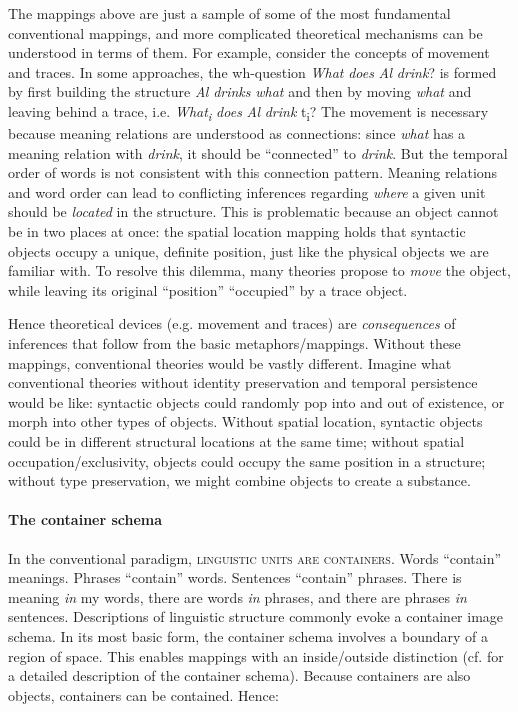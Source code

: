   The mappings above are just a sample of some of the most fundamental conventional mappings, and more complicated theoretical mechanisms can be understood in terms of them. For example, consider the concepts of movement and traces. In some approaches, the wh-question \textit{What} \textit{does} \textit{Al} \textit{drink}? is formed by first building the structure \textit{Al} \textit{drinks} \textit{what} and then by moving \textit{what} and leaving behind a trace, i.e. \textit{What\textsubscript{i}} \textit{does} \textit{Al} \textit{drink} t\textsubscript{i}? The movement is necessary because meaning relations are understood as connections: since \textit{what} has a meaning relation with \textit{drink}, it should be “connected” to \textit{drink}. But the temporal order of words is not consistent with this connection pattern. Meaning relations and word order can lead to conflicting inferences regarding \textit{where} a given unit should be \textit{located} in the structure. This is problematic because an object cannot be in two places at once: the spatial location mapping holds that syntactic objects occupy a unique, definite position, just like the physical objects we are familiar with. To resolve this dilemma, many theories propose to \textit{move} the object, while leaving its original “position” “occupied” by a trace object.

  Hence theoretical devices (e.g. movement and traces) are \textit{consequences} of inferences that follow from the basic metaphors/mappings. Without these mappings, conventional theories would be vastly different. Imagine what conventional theories without identity preservation and temporal persistence would be like: syntactic objects could randomly pop into and out of existence, or morph into other types of objects. Without spatial location, syntactic objects could be in different structural locations at the same time; without spatial occupation/exclusivity, objects could occupy the same position in a structure; without type preservation, we might combine objects to create a substance.

\paragraph{The container schema} 

In the conventional paradigm, \textsc{linguistic} \textsc{units} \textsc{are} \textsc{containers}. Words “contain” meanings. Phrases “contain” words. Sentences “contain” phrases. There is meaning \textit{in} my words, there are words \textit{in} phrases, and there are phrases \textit{in} sentences. Descriptions of linguistic structure commonly evoke a container image schema. In its most basic form, the container schema involves a boundary of a region of space. This enables mappings with an inside/outside distinction (cf. \citet{LakoffNúñez2000} for a detailed description of the container schema). Because containers are also objects, containers can be contained. Hence:

